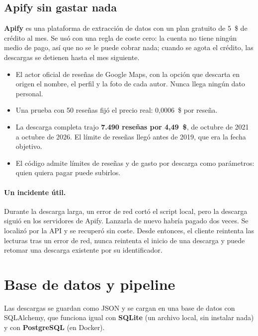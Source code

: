 \documentclass[11pt,a4paper]{article}
\begin{document}
\subsection{Apify sin gastar nada}

\textbf{Apify} es una plataforma de extracción de datos con un plan gratuito de 5~\$ de crédito al mes. Se usó con
una regla de coste cero: la cuenta no tiene ningún medio de pago, así que no se le puede cobrar nada; cuando se
agota el crédito, las descargas se detienen hasta el mes siguiente.

\begin{itemize}
  \item El actor oficial de reseñas de Google Maps, con la opción que descarta en origen el nombre, el perfil y la
        foto de cada autor. Nunca llega ningún dato personal.
  \item Una prueba con 50 reseñas fijó el precio real: 0,0006~\$ por reseña.
  \item La descarga completa trajo \textbf{7.490 reseñas por 4,49~\$}, de octubre de 2021 a octubre de 2026. El
        límite de reseñas llegó antes de 2019, que era la fecha objetivo.
  \item El código admite límites de reseñas y de gasto por descarga como parámetros: quien quiera pagar puede
        subirlos.
\end{itemize}

\paragraph{Un incidente útil.} Durante la descarga larga, un error de red cortó el script local, pero la descarga
siguió en los servidores de Apify. Lanzarla de nuevo habría pagado dos veces. Se localizó por la API y se recuperó
sin coste. Desde entonces, el cliente reintenta las lecturas tras un error de red, nunca reintenta el inicio de una
descarga y puede retomar una descarga existente por su identificador.

\section{Base de datos y pipeline}

Las descargas se guardan como JSON y se cargan en una base de datos con SQLAlchemy, que funciona igual con
\textbf{SQLite} (un archivo local, sin instalar nada) y con \textbf{PostgreSQL} (en Docker).
\end{document}
